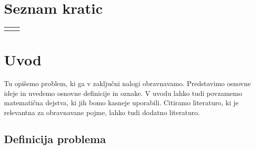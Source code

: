 \documentclass[12pt,a4paper,titlepage,openany]{report}
\begin{document}
\tableofcontents
{}
\newpage
\listoftables
{}
\newpage
\listoffigures
{}
\newpage
\renewcommand{\cftdot}{}
\listofappendices
\thispagestyle{fancy}
\newpage

\chapter*{Seznam kratic}
\thispagestyle{fancyplain}
\begin{longtable}{@{}p{1cm}@{}p{\dimexpr\textwidth-1cm\relax}@{}}
\nomenclature{$tj.$}{to je}
\nomenclature{$npr.$}{na primer}
\end{longtable}
\newpage

\normalsize


% 
% 

\chapter{Uvod}
\thispagestyle{fancy}

Tu opišemo problem, ki ga v zaključni nalogi obravnavamo. Predstavimo osnovne ideje in uvedemo
osnovne definicije in oznake. V uvodu lahko tudi povzamemo matematična dejstva, ki jih bomo
kasneje uporabili. Citiramo literaturo, ki je relevantna za obravnavane pojme, lahko tudi dodatno literaturo.

\section{Definicija problema}
\thispagestyle{fancy}
\end{document}
